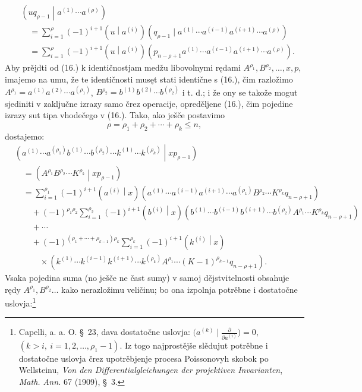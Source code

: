 \documentclass[11pt]{article}
\newcommand{\pair}[2]{\left(#1\middle|#2\right)}
\begin{document}
\begin{equation}
\begin{aligned}
&\pair{u q_{\rho-1}}{a^{(1)}\cdots a^{(\rho)}}\\
&\quad=\sum_{i=1}^{\rho}(-1)^{i+1}\pair{u}{a^{(i)}}
(q_{\rho-1}\mid a^{(1)}\cdots a^{(i-1)}a^{(i+1)}\cdots a^{(\rho)})\\
&\quad=\sum_{i=1}^{\rho}(-1)^{i+1}\pair{u}{a^{(i)}}
(p_{n-\rho+1}a^{(1)}\cdots a^{(i-1)}a^{(i+1)}\cdots a^{(\rho)}).
\end{aligned}
\tag{17}
\end{equation}
Aby prějdti od (16.) k identičnostjam medžu libovolnymi rędami $A^{\rho_1},B^{\rho_2},\ldots,x,p$, imajemo na umu, že te identičnosti musęt stati identične s (16.), čim razložimo $A^{\rho_1}=a^{(1)}a^{(2)}\cdots a^{(\rho_1)}$, $B^{\rho_2}=b^{(1)}b^{(2)}\cdots b^{(\rho_2)}$ i t. d.; i že ony se takože mogut sjediniti v zaključne izrazy samo črez operacije, opreděljene (16.), čim pojedine izrazy sut tipa vhodečego v (16.). Tako, ako ješče postavimo
\begin{equation}
 \rho=\rho_1+\rho_2+\cdots+\rho_k\le n,
\tag{18}
\end{equation}
dostajemo:
\[
\begin{aligned}
&\pair{a^{(1)}\cdots a^{(\rho_1)}b^{(1)}\cdots b^{(\rho_2)}
\cdots k^{(1)}\cdots k^{(\rho_k)}}{xp_{\rho-1}}\\
&\quad=\pair{A^{\rho_1}B^{\rho_2}\cdots K^{\rho_k}}{xp_{\rho-1}} \\
&\quad=\sum_{i=1}^{\rho_1}(-1)^{i+1}\pair{a^{(i)}}{x}
(a^{(1)}\cdots a^{(i-1)}a^{(i+1)}\cdots a^{(\rho_1)}
B^{\rho_2}\cdots K^{\rho_k}q_{n-\rho+1})\\
&\qquad+(-1)^{\rho_1\rho_2}\sum_{i=1}^{\rho_2}(-1)^{i+1}\pair{b^{(i)}}{x}
(b^{(1)}\cdots b^{(i-1)}b^{(i+1)}\cdots b^{(\rho_2)}
A^{\rho_1}\cdots K^{\rho_k}q_{n-\rho+1})\\
&\qquad+\cdots\\
&\qquad+(-1)^{(\rho_1+\cdots+\rho_{k-1})\rho_k}
\sum_{i=1}^{\rho_k}(-1)^{i+1}\pair{k^{(i)}}{x}\\
&\qquad\quad\times
(k^{(1)}\cdots k^{(i-1)}k^{(i+1)}\cdots k^{(\rho_k)}
A^{\rho_1}\cdots (K-1)^{\rho_{k-1}}q_{n-\rho+1}).
\end{aligned}
\]
Vsaka pojedina suma (no ješče ne čast sumy) v samoj dějstvitelnosti obsahuje rędy $A^{\rho_1},B^{\rho_2}\ldots$ kako nerazložimu veličinu; bo ona izpolnja potrěbne i dostatočne uslovja:\footnote{Capelli, a. a. O. \S\ 23, dava dostatočne uslovja: $\bigl(a^{(k)}\mid \frac{\partial}{\partial a^{(i)}}\bigr)=0$, $(k>i,\ i=1,2,\ldots,\rho_1-1)$. Iz togo najprostějše slědujut potrěbne i dostatočne uslovja črez upotrěbjenje procesa Poissonovyh skobok po Wellsteinu, \emph{Von den Differentialgleichungen der projektiven Invarianten}, \emph{Math. Ann.} 67 (1909), \S\ 3.}
\end{document}
